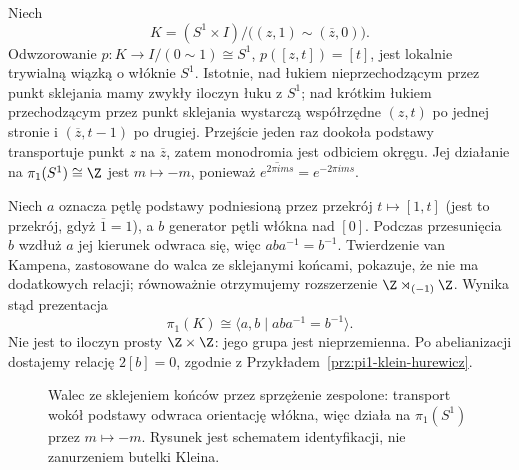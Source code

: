 \begin{przyklad}
\label{prz:fib-klein-monodromia}
Niech
\[
 K=(S^1\times I)/\bigl((z,1)\sim(\overline z,0)\bigr).
\]
Odwzorowanie $p:K\to I/(0\sim1)\cong S^1$,
$p([z,t])=[t]$, jest lokalnie trywialną wiązką
o włóknie $S^1$. Istotnie, nad łukiem nieprzechodzącym
przez punkt sklejania mamy zwykły iloczyn łuku z $S^1$;
nad krótkim łukiem przechodzącym przez punkt sklejania
wystarczą współrzędne $(z,t)$ po jednej stronie i
$(\overline z,t-1)$ po drugiej.
Przejście jeden raz dookoła podstawy transportuje
punkt $z$ na $\overline z$, zatem monodromia
jest odbiciem okręgu.
Jej działanie na $\pi_1(S^1)\cong\Z$ jest
$m\mapsto-m$, ponieważ
$\overline{e^{2\pi i m s}}=e^{-2\pi i m s}$.

Niech $a$ oznacza pętlę podstawy podniesioną
przez przekrój $t\mapsto[1,t]$
(jest to przekrój, gdyż $\overline1=1$),
a $b$ generator pętli włókna nad $[0]$.
Podczas przesunięcia $b$ wzdłuż $a$
jej kierunek odwraca się, więc
$a b a^{-1}=b^{-1}$.
Twierdzenie van Kampena, zastosowane do
walca ze sklejanymi końcami, pokazuje, że
nie ma dodatkowych relacji; równoważnie
otrzymujemy rozszerzenie
$\Z\rtimes_{(-1)}\Z$.
Wynika stąd prezentacja
\[
 \pi_1(K)\cong
 \langle a,b\mid aba^{-1}=b^{-1}\rangle.
\]
Nie jest to iloczyn prosty $\Z\times\Z$:
jego grupa jest nieprzemienna.
Po abelianizacji dostajemy relację
$2[b]=0$, zgodnie z
Przykładem~\ref{prz:pi1-klein-hurewicz}.
\end{przyklad}

\begin{figure}[!htbp]
\centering
{}
\caption{Walec ze sklejeniem końców przez sprzężenie
zespolone: transport wokół podstawy odwraca orientację
włókna, więc działa na $\pi_1(S^1)$ przez $m\mapsto-m$.
Rysunek jest schematem identyfikacji, nie zanurzeniem butelki Kleina.}
\label{fig:fib-klein-monodromia}
\end{figure}

